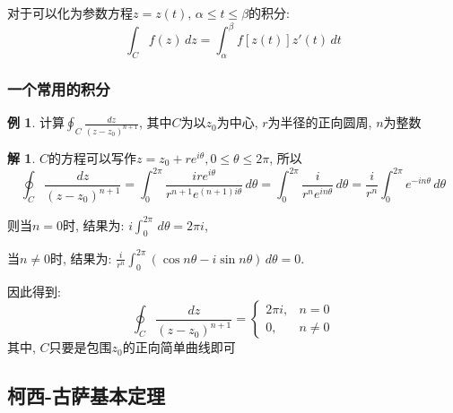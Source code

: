 \documentclass[12pt, a4paper, oneside]{ctexart}
\theoremstyle{plain}
\theoremstyle{definition}
\newtheorem{example}{例}
\theoremstyle{definition}
\newtheorem*{solution}{解}
\begin{document}
对于可以化为参数方程$z=z(t),\,\alpha\leq t\leq\beta$的积分:
\[
    \int_{C}f(z)\,dz=\int_{\alpha}^{\beta}f[z(t)]z'(t)\,dt
\]
\subsubsection{一个常用的积分}
\begin{example}
    计算$\oint_{C}\frac{dz}{(z-z_{0})^{n+1}}$, 其中$C$为以$z_{0}$为中心, $r$为半径的正向圆周, $n$为整数
\end{example}
\begin{solution}
    $C$的方程可以写作$z=z_{0}+re^{i\theta},0\leq\theta\leq2\pi$, 所以
    \[
        \oint_{C}\frac{dz}{(z-z_{0})^{n+1}}=\int_{0}^{2\pi}\frac{ire^{i\theta}}{r^{n+1}e^{(n+1)i\theta}}\,d\theta
        =\int_{0}^{2\pi}\frac{i}{r^{n}e^{in\theta}}\,d\theta=\frac{i}{r^{n}}\int_{0}^{2\pi}e^{-in\theta}\,d\theta
    \]

    则当$n=0$时, 结果为: $i\int_{0}^{2\pi}\,d\theta=2\pi i$,

    当$n\neq0$时, 结果为: $\frac{i}{r^{n}}\int_{0}^{2\pi}(\cos n\theta-i\sin n\theta)\,d\theta=0$.
\end{solution}
    \noindent 因此得到: 
    \[
        \oint_{C}\frac{dz}{(z-z_{0})^{n+1}}=
        \begin{cases}
            2\pi i, & n=0\\
            0, &n\neq 0
        \end{cases}
    \]
    其中, $C$只要是包围$z_{0}$的正向简单曲线即可
\subsection{柯西-古萨基本定理}
\end{document}
